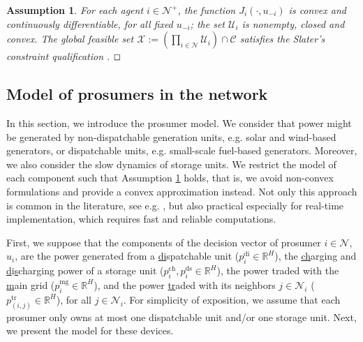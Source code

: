 \documentclass{IEEEtran}  %
\newtheorem{assumption}{Assumption}
\newcommand{\eod}{\ensuremath{\hfill\Box}}
\newcommand{\bs}{\boldsymbol}
\newcommand{\mc}{\mathcal}
\newcommand{\bb}{\mathbb}
\newcommand{\0}{\mathbf{0}}
\newcommand{\1}{\mathbf{1}}
\begin{document}
\begin{assumption}
	\label{as:gen}
For each agent $i\in \mc N^+$, the function $J_i(\cdot,u_{-i})$ is convex and continuously differentiable, for all fixed $u_{-i}$; the set $\mc U_i$ is nonempty, closed and convex. The global feasible set $\bs {\mc X}:=\left( \prod_{i \in \mc N} \mc U_i \right) \cap \mc C $ satisfies the Slater's constraint qualification \cite[Eq. (27.50)]{bauschke2011convex}.  \eod
\end{assumption}

\subsection{Model of prosumers in the network}
\label{sec:mod_comp}
In this section, we introduce the prosumer model. We consider that power might be generated by non-dispatchable generation units, e.g. solar and wind-based generators, or dispatchable units, e.g. small-scale fuel-based generators.
%
Moreover, we also consider the slow dynamics of storage units. We restrict the model of each component such that Assumption \ref{as:gen} holds, that is, we avoid non-convex formulations and provide a convex approximation instead. Not only this approach is common in the literature, see e.g.   \cite{moret2020,atzeni2013,molzahn2017}, but also practical especially for real-time implementation, which requires fast and reliable computations.
 
First, we suppose that the components of the decision vector of prosumer $i \in \mc N$, $u_{i}$, are the power generated from a \underline{di}spatchable unit ($p_{i}^{\mathrm{di}} \in \bb R^{H}$),	the {\underline{ch}arging and \underline{d}i\underline{s}charging } power of a storage unit {($p_{i}^{\mathrm{ch}}, p_{i}^{\mathrm{ds}} \in \bb R^{H}$)}, the power traded with the \underline{m}ain \underline{g}rid ($p_{i}^{\mathrm{mg}} \in \bb R^H$), and the power \underline{tr}aded with its neighbors $j \in \mc N_i$ ($p_{(i,j)}^{\mathrm{tr}} \in \bb R^H$), for all $j \in \mc N_i$. 
For simplicity of exposition, we assume that each prosumer only owns at most one dispatchable unit and/or one storage unit. 
Next, we present the model for these devices.


\end{document}
